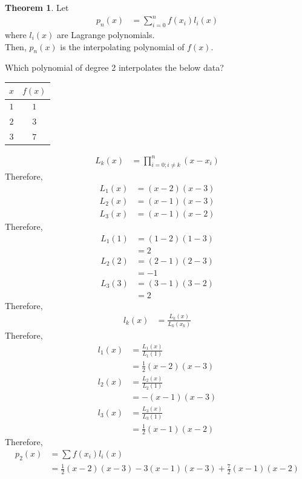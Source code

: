 \documentclass[fleqn, a4paper, 12pt, twoside]{article}
\theoremstyle{definition}
\theoremstyle{theorem}
\newtheorem{theorem}{Theorem}
\begin{document}
\begin{theorem}
	Let
	\begin{align*}
		p_n(x) & = \sum\limits_{i = 0}^{n} f(x_i) l_i(x)
	\end{align*}
	where $l_i(x)$ are Lagrange polynomials.\\
	Then, $p_n(x)$ is the interpolating polynomial of $f(x)$.
\end{theorem}

\begin{question}
	Which polynomial of degree 2 interpolates the below data?
	\begin{table}[H]
		\centering
		\begin{tabular}{c|c}
			$x$ & $f(x)$\\
			\hline
			$1$ & $1$\\
			$2$ & $3$\\
			$3$ & $7$\\
		\end{tabular}
	\end{table}
\end{question}

\begin{solution}
	\begin{align*}
		L_k(x) & = \prod\limits_{i = 0 ; i \neq k}^{n} (x - x_i)
	\end{align*}
	Therefore,
	\begin{align*}
		L_1(x) & = (x - 2) (x - 3) \\
		L_2(x) & = (x - 1) (x - 3) \\
		L_3(x) & = (x - 1) (x - 2)
	\end{align*}
	Therefore,
	\begin{align*}
		L_1(1) & = (1 - 2) (1 - 3) \\
                       & = 2               \\
		L_2(2) & = (2 - 1) (2 - 3) \\
                       & = -1              \\
		L_3(3) & = (3 - 1) (3 - 2) \\
                       & = 2
	\end{align*}
	Therefore,
	\begin{align*}
		l_k(x) & = \frac{L_k(x)}{L_k(x_k)}
	\end{align*}
	Therefore,
	\begin{align*}
		l_1(x) & = \frac{L_1(x)}{L_1(1)}       \\
                       & = \frac{1}{2} (x - 2) (x - 3) \\
		l_2(x) & = \frac{L_2(x)}{L_2(1)}       \\
                       & = -(x - 1) (x - 3)            \\
		l_3(x) & = \frac{L_3(x)}{L_3(1)}       \\
                       & = \frac{1}{2} (x - 1) (x - 2)
	\end{align*}
	Therefore,
	\begin{align*}
		p_2(x) & = \sum f(x_i) l_i(x) \\
                       & = \frac{1}{2} (x - 2) (x - 3) - 3 (x - 1) (x - 3) + \frac{7}{2} (x - 1) (x - 2)
	\end{align*}
\end{solution}
\end{document}

